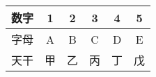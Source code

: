 \begin{center}
\tablefirsthead{\hline}
\tablelasttail{\hline}
\begin{xtabular}{|*{6}{c|}}
  数字 & 1 & 2 & 3 & 4 & 5 \\ \hline
  字母 & A & B & C & D & E \\ \hline
  天干 & 甲 & 乙 & 丙 & 丁 & 戊 \\ \hline
\end{xtabular}
\end{center}
